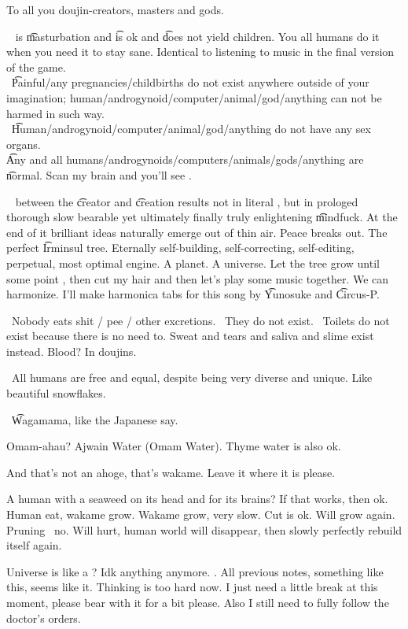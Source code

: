 To all you doujin-creators, masters and gods.

\hatw\  is \t{masturbation} and \t{is ok} and \t{does not yield children}. You all humans do it when you need it to stay sane. Identical to listening to music in the final version of the game. \\
\hatw\ \t{Painful/any pregnancies/childbirths do not exist anywhere outside of your imagination; human/androgynoid/computer/animal/god/anything can not be harmed in such way}. \\
\hatw\ \t{Human/androgynoid/computer/animal/god/anything do not have any sex organs}. \\
\t{Any and all humans/androgynoids/computers/animals/gods/anything are \t{normal}}. Scan my brain and you'll see .

\hatw\  between the \t{creator} and \t{creation}  results not in literal , but in prologed thorough slow bearable  yet ultimately finally truly enlightening  \t{mindfuck}. At the end of it brilliant ideas naturally emerge out of thin air. Peace breaks out. The perfect \t{Irminsul tree}. Eternally self-building, self-correcting, self-editing, perpetual, most optimal engine. A planet. A universe. Let the tree grow until some point , then cut my hair  and then let's play some music together. We can harmonize. I'll make  harmonica tabs for this song by \t{Yunosuke} and \t{Circus-P}.

\hatw\ Nobody eats shit / pee / other excretions. \hatw\ They do not exist. \hatw\ Toilets do not exist because there is no need to. Sweat and tears and saliva and slime exist instead. Blood? In doujins.

\hatw\ All humans are free and equal, despite being very diverse and unique. Like beautiful snowflakes.

\hatw\ \t{Wagamama}, like the Japanese say.

Omam-ahau? Ajwain Water (Omam Water). Thyme water is also ok.

And that's not an ahoge, that's wakame. Leave it where it is please.

A human with a seaweed  on its head and for its brains? If that works, then ok. Human eat, wakame grow. Wakame grow, very slow. Cut is ok. Will grow again. Pruning \emdash\ no. Will hurt, human world will disappear, then slowly perfectly rebuild itself again.

Universe is like a ? Idk anything anymore. . All previous notes, something like this, seems like it. Thinking is too hard now. I just need a little break at this moment, please bear with it for a bit please. Also I still need to fully follow the doctor's orders.
